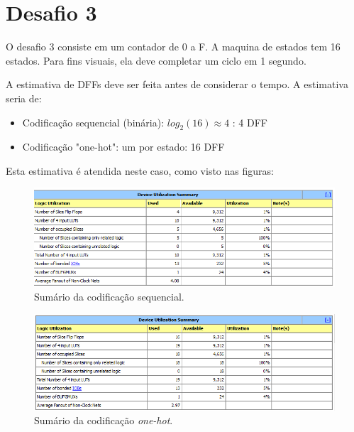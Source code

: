 \documentclass[12pt]{article}
\begin{document}
\clearpage
\section{Desafio 3}
O desafio 3 consiste em um contador de 0 a F. A maquina de estados tem 16 estados. Para fins visuais, ela deve completar um ciclo em 1 segundo. 

A estimativa de DFFs deve ser feita antes de considerar o tempo. A estimativa seria de:

\begin{itemize}  
\item Codificação sequencial (binária): \begin{math}log_{2}(16)\approx 4\end{math} : 4 DFF
\item Codificação "one-hot": um por estado: 16 DFF
\end{itemize}

Esta estimativa é atendida neste caso, como visto nas figuras:

\begin{figure}[!h]
    \centering
    \includegraphics[width=1.0\textwidth]{agora2.PNG}
    \caption{Sumário da codificação sequencial.}
\end{figure}

\begin{figure}[!h]
    \centering
    \includegraphics[width=1.0\textwidth]{agora.PNG}
    \caption{Sumário da codificação \emph{one-hot}.}
\end{figure}
\end{document}
